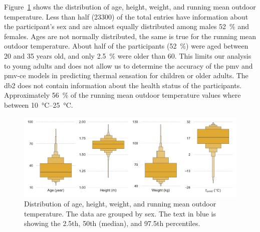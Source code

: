 Figure~\ref{fig:dist_other_data} shows the distribution of age, height, weight, and running mean outdoor temperature.
Less than half (\num{23300}) of the total entries have information about the participant's sex and are almost equally distributed among males \qty{52}{\percent} and females.
Ages are not normally distributed, the same is true for the running mean outdoor temperature.
About half of the participants (\qty{52}{\percent}) were aged between \num{20} and \num{35} years old, and only \qty{2.5}{\percent} were older than 60.
This limits our analysis to young adults and does not allow us to determine the accuracy of the \ac{pmv} and \ac{pmv-ce} models in predicting thermal sensation for children or older adults.
The \ac{db2} does not contain information about the health status of the participants.
Approximately \qty{56}{\percent} of the running mean outdoor temperature values where between \qtyrange{10}{25}{\celsius}.
\begin{figure}[htb!]
    \centering
    \includegraphics[width=\textwidth]{figures/dist_other_data}
    \caption{Distribution of age, height, weight, and running mean outdoor temperature.
    The data are grouped by sex.
    The text in blue is showing the 2.5th, 50th (median), and 97.5th percentiles.}
    \label{fig:dist_other_data}
\end{figure}

